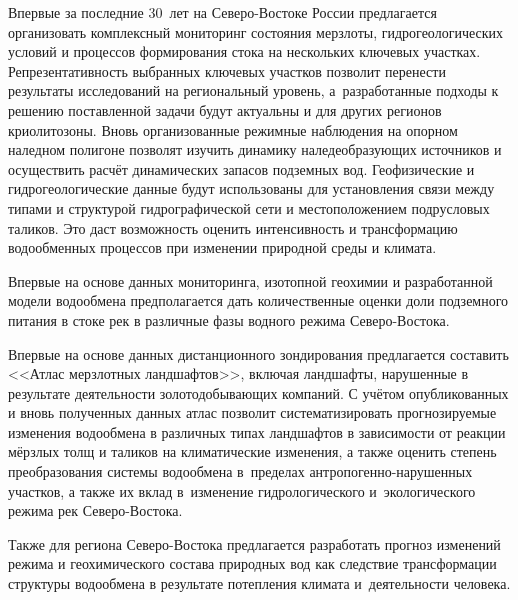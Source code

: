 Впервые за последние 30~лет на Северо-Востоке России предлагается организовать комплексный мониторинг состояния мерзлоты, гидрогеологических условий и процессов формирования стока на нескольких ключевых участках. Репрезентативность выбранных ключевых участков позволит перенести результаты исследований на региональный уровень, а~разработанные подходы к решению поставленной задачи будут актуальны и для других регионов криолитозоны.
\clearpage
Вновь организованные режимные наблюдения на опорном наледном полигоне позволят изучить динамику наледеобразующих источников и осуществить расчёт динамических запасов подземных вод. Геофизические и гидрогеологические данные будут использованы для установления связи между типами и структурой гидрографической сети и местоположением подрусловых таликов. Это даст возможность оценить интенсивность и трансформацию водообменных процессов при изменении природной среды и климата.

Впервые на основе данных мониторинга, изотопной геохимии и разработанной модели водообмена предполагается дать количественные оценки доли подземного питания в стоке рек в различные фазы водного режима Северо-Востока.

Впервые на основе данных дистанционного зондирования предлагается составить <<Атлас мерзлотных ландшафтов>>, включая ландшафты, нарушенные в результате деятельности золотодобывающих компаний. С учётом опубликованных и вновь полученных данных атлас позволит систематизировать прогнозируемые изменения водообмена в различных типах ландшафтов в зависимости от реакции мёрзлых толщ и таликов на климатические изменения, а также оценить степень преобразования системы водообмена в~пределах антропогенно-нарушенных участков, а также их вклад в~изменение гидрологического и~экологического режима рек Северо-Востока.

Также для региона Северо-Востока предлагается разработать прогноз изменений режима и геохимического состава природных вод как следствие трансформации структуры водообмена в результате потепления климата и~деятельности человека.

